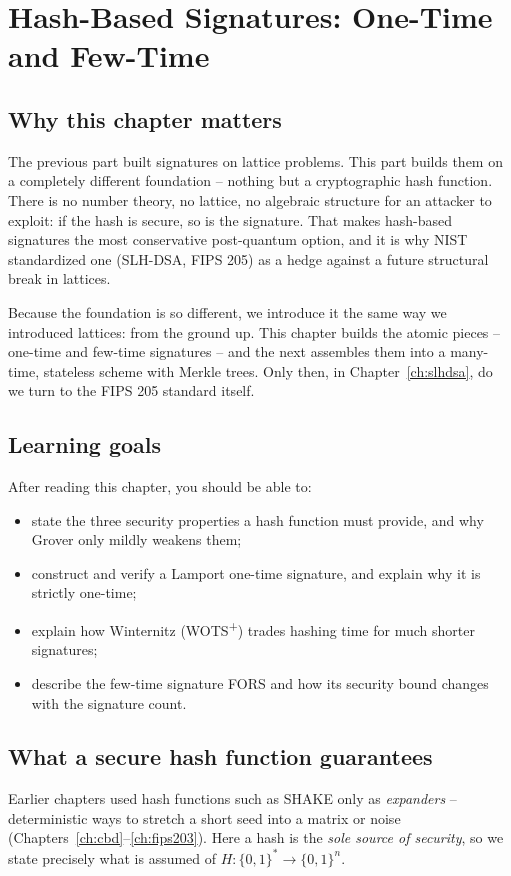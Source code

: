 \chapter{Hash-Based Signatures: One-Time and Few-Time}
\label{ch:hashots}

\section{Why this chapter matters}
The previous part built signatures on lattice problems. This part builds them on a completely different foundation -- nothing but a cryptographic hash function. There is no number theory, no lattice, no algebraic structure for an attacker to exploit: if the hash is secure, so is the signature. That makes hash-based signatures the most conservative post-quantum option, and it is why NIST standardized one (SLH-DSA, FIPS 205) as a hedge against a future structural break in lattices.

Because the foundation is so different, we introduce it the same way we introduced lattices: from the ground up. This chapter builds the atomic pieces -- one-time and few-time signatures -- and the next assembles them into a many-time, stateless scheme with Merkle trees. Only then, in Chapter~\ref{ch:slhdsa}, do we turn to the FIPS 205 standard itself.

\section{Learning goals}
After reading this chapter, you should be able to:

\begin{itemize}
  \item state the three security properties a hash function must provide, and why Grover only mildly weakens them;
  \item construct and verify a Lamport one-time signature, and explain why it is strictly one-time;
  \item explain how Winternitz (WOTS\textsuperscript{+}) trades hashing time for much shorter signatures;
  \item describe the few-time signature FORS and how its security bound changes with the signature count.
\end{itemize}

\section{What a secure hash function guarantees}
Earlier chapters used hash functions such as SHAKE only as \emph{expanders} -- deterministic ways to stretch a short seed into a matrix or noise (Chapters~\ref{ch:cbd}--\ref{ch:fips203}). Here a hash is the \emph{sole source of security}, so we state precisely what is assumed of $H:\{0,1\}^*\to\{0,1\}^n$.

